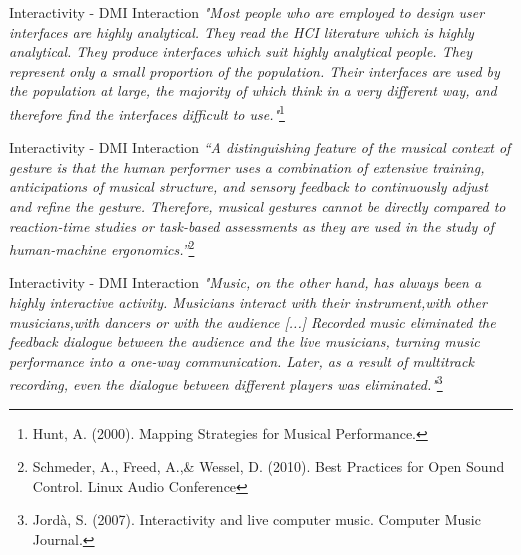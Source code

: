 \documentclass{beamer}
\begin{document}
\begin{frame}{Interactivity - DMI Interaction} 
    \textit{"Most people who are employed to design user interfaces are highly analytical. They read the HCI literature which is highly analytical. They produce interfaces which suit highly analytical people. They represent only a small proportion of the population. Their interfaces are used by the population at large, the majority of which think in a very different way, and therefore find the interfaces difficult to use."}\footnote{Hunt, A. (2000). Mapping Strategies for Musical Performance.}
\end{frame}

\begin{frame}{Interactivity - DMI Interaction} 
    \textit{“A distinguishing feature of the musical context of gesture is that the human performer uses a combination of extensive training, anticipations of musical structure, and sensory feedback to continuously adjust and refine the gesture. Therefore, musical gestures cannot be directly compared to reaction-time studies or task-based assessments as they are used in the study of human-machine ergonomics.”}\footnote{Schmeder, A., Freed, A.,\& Wessel, D. (2010). Best Practices for Open Sound Control. Linux Audio Conference}
\end{frame}





\begin{frame}{Interactivity - DMI Interaction} 
    \textit{"Music, on the other hand, has always been a highly interactive activity. Musicians interact with their instrument,with other musicians,with dancers or with the audience [...] Recorded music eliminated the feedback dialogue between the audience and the live musicians, turning music performance into a one-way communication. Later, as a result of multitrack recording, even the dialogue between different players was eliminated."}\footnote{Jordà, S. (2007). Interactivity and live computer music. Computer Music Journal.}
\end{frame}
\end{document}
